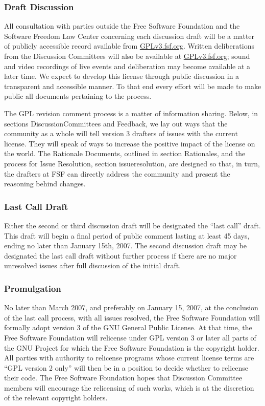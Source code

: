 \documentclass[a4paper,spanish,12pt]{book}
\begin{document}
\subsubsection{Draft Discussion} All consultation with parties outside the
Free Software Foundation and the Software Freedom Law Center
concerning each discussion draft will be a matter of publicly
accessible record available from \url{GPLv3.fsf.org}.  Written
deliberations from the Discussion Committees will also be available at
\url{GPLv3.fsf.org}; sound and video recordings of live events and
deliberation may become available at a later time.  We expect to
develop this license through public discussion in a transparent and
accessible manner.  To that end every effort will be made to make
public all documents pertaining to the process.

The GPL revision comment process is a matter of information sharing.
Below, in sections DiscussionCommittees and Feedback, we
lay out ways that the community as a whole will tell version 3
drafters of issues with the current license.  They will speak of ways
to increase the positive impact of the license on the world.  The
Rationale Documents, outlined in section Rationales, and the
process for Issue Resolution, section issueresolution, are
designed so that, in turn, the drafters at FSF can directly address
the community and present the reasoning behind changes.

\subsubsection{Last Call Draft}\label{lastcall} Either the second or third
discussion draft will be designated the ``last call'' draft.  This
draft will begin a final period of public comment lasting at least 45
days, ending no later than January 15th, 2007.  The second discussion
draft may be designated the last call draft without further process if
there are no major unresolved issues after full discussion of the
initial draft.

\subsubsection{Promulgation} No later than March 2007, and preferably on
January 15, 2007, at the conclusion of the last call process, with all
issues resolved, the Free Software Foundation will formally adopt
version 3 of the GNU General Public License.  At that time, the Free
Software Foundation will relicense under GPL version 3 or later all
parts of the GNU Project for which the Free Software Foundation is the
copyright holder. All parties with authority to relicense programs
whose current license terms are ``GPL version 2 only'' will then be in
a position to decide whether to relicense their code.  The Free
Software Foundation hopes that Discussion Committee members will
encourage the relicensing of such works, which is at the discretion of
the relevant copyright holders.
\end{document}
